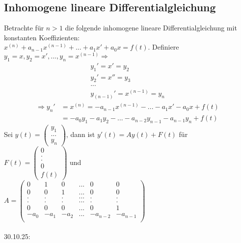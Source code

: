 \documentclass[12pt,a4paper]{article}
\newcommand{\DGL}{Differentialgleichung }
\begin{document}
\subsection{Inhomogene lineare \DGL}
Betrachte für $n>1$ die folgende inhomogene lineare \DGL mit konstanten Koeffizienten:\\
$x^{(n)} + a_{n-1}x^{(n-1)} + ... + a_1x' + a_0x = f(t)$. Definiere $y_1=x, y_2=x', ..., y_n = x^(n-1) \Rightarrow$
\begin{align*}
y_1'=x'=y_2 \\
y_2'=x''=y_3 \\
... \\
y_{(n-1)}'=x^{(n-1)} = y_n
\end{align*}
\begin{align*}
\Rightarrow y_n' &= x^{(n)} = -a_{n-1}x^{(n-1)} - ... - a_1x'-a_0x+f(t) \\
&= -a_0y_1-a_1y_2-...-a_{n-2}y_{n-1}-a_{n-1}y_n+f(t)
\end{align*}
Sei $y(t) = \begin{pmatrix}
y_1 \\
... \\
y_n
\end{pmatrix}$, dann ist $y'(t) = Ay(t) + F(t)$ für $F(t) = \begin{pmatrix}
0 \\
. \\
. \\
0 \\
f(t)
\end{pmatrix}$ und \\ $A=\begin{pmatrix}
0 & 1 & 0 & ... & 0 & 0 \\
0 & 0 & 1 & ... & 0 & 0 \\
. & . & . & ... & . & . \\
. & . & . & ... & . & . \\
0 & 0 & 0 & ... & 0 & 1 \\
-a_0 & -a_1 & -a_2 & ... & -a_{n-2} & -a_{n-1} \\
\end{pmatrix}$ \\ \\
30.10.25:
\end{document}
